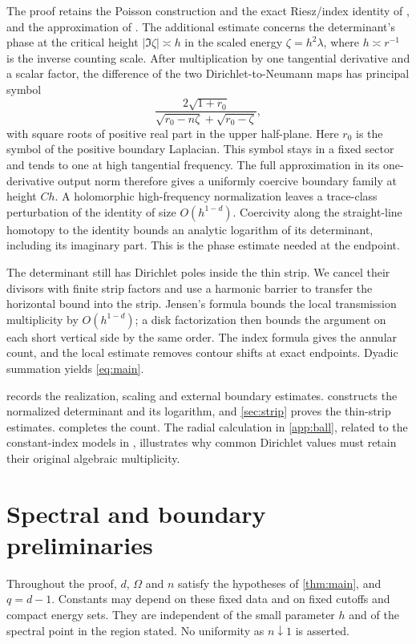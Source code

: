 \documentclass[11pt,a4paper]{article}
\theoremstyle{remark}
\numberwithin{equation}{section}
\begin{document}
The proof retains the Poisson construction and the exact Riesz/index
identity of \cite{PV}, and the approximation of \cite{Vdn}. The
additional estimate concerns the determinant's phase at the critical
height $|\Im\zeta|\asymp h$ in the scaled energy $\zeta=h^2\lambda$,
where $h\asymp r^{-1}$ is the inverse counting scale. After multiplication by one tangential
derivative and a scalar factor, the difference of the two
Dirichlet-to-Neumann maps has principal symbol
\[
 \frac{2\sqrt{1+r_0}}{
 \sqrt{r_0-n\zeta}+\sqrt{r_0-\zeta}},
\]
with square roots of positive real part in the upper half-plane.
Here $r_0$ is the symbol of the positive boundary Laplacian.
This symbol stays in a fixed sector and tends to one at high tangential
frequency. The full approximation in its one-derivative output norm
therefore gives a uniformly coercive boundary family at height $Ch$.
A holomorphic high-frequency normalization leaves a trace-class
perturbation of the identity of size $O(h^{1-d})$. Coercivity along the
straight-line homotopy to the identity bounds an analytic logarithm
of its determinant, including its imaginary part. This is the
phase estimate needed at the endpoint.

The determinant still has Dirichlet poles inside the thin strip.
We cancel their divisors with finite strip factors and use a harmonic
barrier to transfer the horizontal bound into the strip. Jensen's
formula bounds the local transmission multiplicity by $O(h^{1-d})$;
a disk factorization then bounds the argument on each short vertical
side by the same order. The index formula gives the annular count,
and the local estimate removes contour shifts at exact endpoints.
Dyadic summation yields \eqref{eq:main}.

 records the realization, scaling and external boundary
estimates.  constructs the normalized determinant and its
logarithm, and \cref{sec:strip} proves the thin-strip estimates.
 completes the count. The radial calculation in
\cref{app:ball}, related to the constant-index models in \cite{PS},
illustrates why common Dirichlet values must retain their original
algebraic multiplicity.


\section{Spectral and boundary preliminaries}\label{sec:prelim}

Throughout the proof, $d$, $\Omega$ and $n$ satisfy the hypotheses of
\cref{thm:main}, and $q=d-1$. Constants may depend on these fixed data and on
fixed cutoffs and compact energy sets. They are independent of the small
parameter $h$ and of the spectral point in the region stated. No uniformity
as $n\downarrow1$ is asserted.
\end{document}
